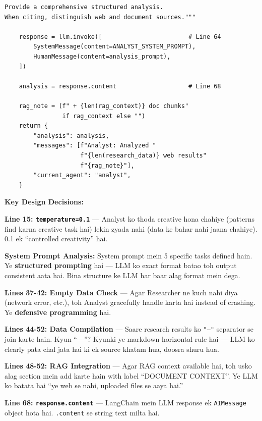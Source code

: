 \documentclass[12pt, a4paper]{article}
\begin{document}
\begin{lstlisting}[style=pythonstyle, title={\color{accentgreen}\faIcon{file} agents/analyst.py --- Full Code (85 lines)}]
Provide a comprehensive structured analysis.
When citing, distinguish web and document sources."""

    response = llm.invoke([                        # Line 64
        SystemMessage(content=ANALYST_SYSTEM_PROMPT),
        HumanMessage(content=analysis_prompt),
    ])

    analysis = response.content                    # Line 68

    rag_note = (f" + {len(rag_context)} doc chunks"
                if rag_context else "")
    return {
        "analysis": analysis,
        "messages": [f"Analyst: Analyzed "
                     f"{len(research_data)} web results"
                     f"{rag_note}"],
        "current_agent": "analyst",
    }
\end{lstlisting}

\begin{codestorybox}
\textbf{Key Design Decisions:}

\textbf{Line 15: \texttt{temperature=0.1}} --- Analyst ko thoda creative hona chahiye (patterns find karna creative task hai) lekin zyada nahi (data ke bahar nahi jaana chahiye). 0.1 ek ``controlled creativity'' hai.

\textbf{System Prompt Analysis:} System prompt mein 5 specific tasks defined hain. Ye \textbf{structured prompting} hai --- LLM ko exact format batao toh output consistent aata hai. Bina structure ke LLM har baar alag format mein dega.

\textbf{Lines 37-42: Empty Data Check} --- Agar Researcher ne kuch nahi diya (network error, etc.), toh Analyst gracefully handle karta hai instead of crashing. Ye \textbf{defensive programming} hai.

\textbf{Lines 44-52: Data Compilation} --- Saare research results ko \texttt{"---"} separator se join karte hain. Kyun ``---''? Kyunki ye markdown horizontal rule hai --- LLM ko clearly pata chal jata hai ki ek source khatam hua, doosra shuru hua.

\textbf{Lines 48-52: RAG Integration} --- Agar RAG context available hai, toh usko alag section mein add karte hain with label ``DOCUMENT CONTEXT''. Ye LLM ko batata hai ``ye web se nahi, uploaded files se aaya hai.''

\textbf{Line 68: \texttt{response.content}} --- LangChain mein LLM response ek \texttt{AIMessage} object hota hai. \texttt{.content} se string text milta hai.
\end{codestorybox}
\end{document}

